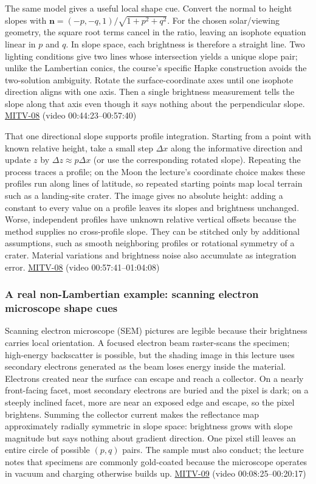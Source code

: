 The same model gives a useful local shape cue. Convert the normal to height slopes with \(\mathbf n=(-p,-q,1)/\sqrt{1+p^2+q^2}\). For the chosen solar/viewing geometry, the square root terms cancel in the ratio, leaving an isophote equation linear in \(p\) and \(q\). In slope space, each brightness is therefore a straight line. Two lighting conditions give two lines whose intersection yields a unique slope pair; unlike the Lambertian conics, the course's specific Hapke construction avoids the two-solution ambiguity. Rotate the surface-coordinate axes until one isophote direction aligns with one axis. Then a single brightness measurement tells the slope along that axis even though it says nothing about the perpendicular slope. \hyperref[04-visual-computing-ii-ch036]{MITV-08} (video 00:44:23--00:57:40)

That one directional slope supports profile integration. Starting from a point with known relative height, take a small step \(\Delta x\) along the informative direction and update \(z\) by \(\Delta z\approx p\Delta x\) (or use the corresponding rotated slope). Repeating the process traces a profile; on the Moon the lecture's coordinate choice makes these profiles run along lines of latitude, so repeated starting points map local terrain such as a landing-site crater. The image gives no absolute height: adding a constant to every value on a profile leaves its slopes and brightness unchanged. Worse, independent profiles have unknown relative vertical offsets because the method supplies no cross-profile slope. They can be stitched only by additional assumptions, such as smooth neighboring profiles or rotational symmetry of a crater. Material variations and brightness noise also accumulate as integration error. \hyperref[04-visual-computing-ii-ch036]{MITV-08} (video 00:57:41--01:04:08)

\subsubsection{A real non-Lambertian example: scanning electron microscope shape cues}\label{a-real-non-lambertian-example-scanning-electron-microscope-shape-cues}

Scanning electron microscope (SEM) pictures are legible because their brightness carries local orientation. A focused electron beam raster-scans the specimen; high-energy backscatter is possible, but the shading image in this lecture uses secondary electrons generated as the beam loses energy inside the material. Electrons created near the surface can escape and reach a collector. On a nearly front-facing facet, most secondary electrons are buried and the pixel is dark; on a steeply inclined facet, more are near an exposed edge and escape, so the pixel brightens. Summing the collector current makes the reflectance map approximately radially symmetric in slope space: brightness grows with slope magnitude but says nothing about gradient direction. One pixel still leaves an entire circle of possible \((p,q)\) pairs. The sample must also conduct; the lecture notes that specimens are commonly gold-coated because the microscope operates in vacuum and charging otherwise builds up. \hyperref[04-visual-computing-ii-ch036]{MITV-09} (video 00:08:25--00:20:17)

